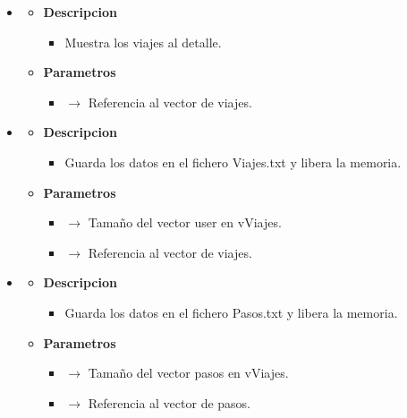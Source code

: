 \begin{itemize}
\begin{itemize}
\begin{itemize}
		\end{itemize}
	\end{itemize}
    \item {}
    \begin{itemize}
        \item \textbf{Descripcion}
        \begin{itemize}
			\item  Muestra los viajes al detalle.
		\end{itemize}
		\item \textbf{Parametros}
		\begin{itemize}
			\item {}  $\rightarrow$ Referencia al vector de viajes.
		\end{itemize}
	\end{itemize}
    \item {}
    \begin{itemize}
        \item \textbf{Descripcion}
        \begin{itemize}
			\item  Guarda los datos en el fichero Viajes.txt y libera la memoria.
		\end{itemize}
		\item \textbf{Parametros}
		\begin{itemize}
            \item {} $\rightarrow$ Tamaño del vector user en vViajes.
			\item {} $\rightarrow$ Referencia al vector de viajes.
		\end{itemize}
	\end{itemize}
    \newpage
    \item {}
    \begin{itemize}
        \item \textbf{Descripcion}
        \begin{itemize}
			\item  Guarda los datos en el fichero Pasos.txt y libera la memoria.
		\end{itemize}
		\item \textbf{Parametros}
		\begin{itemize}
            \item {} $\rightarrow$ Tamaño del vector pasos en vViajes.
			\item {} $\rightarrow$ Referencia al vector de pasos.

\end{itemize}
\end{itemize}
\end{itemize}
